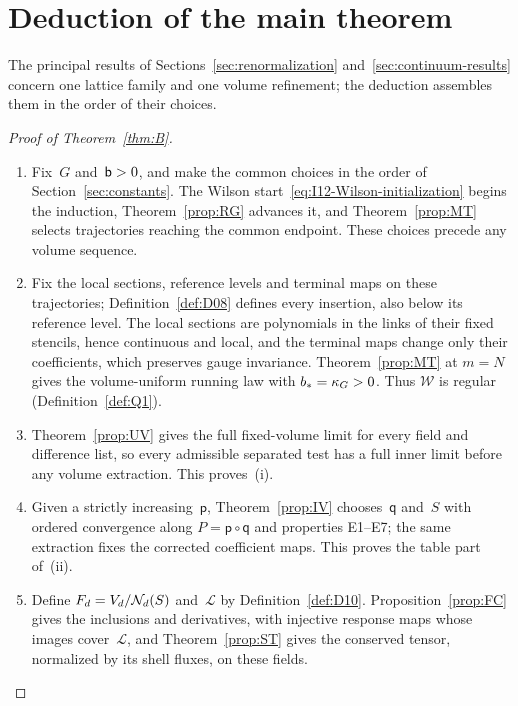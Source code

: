 \section{Deduction of the main theorem}\label{sec:deduction}

The principal results of Sections~\ref{sec:renormalization} and~\ref{sec:continuum-results} concern one lattice family and one volume refinement; the deduction assembles them in the order of their choices.

\begin{proof}[Proof of Theorem~\ref{thm:B}]
\begin{enumerate}[label=\textup{\arabic*.},ref=\arabic*,itemsep=0.25em]
\item\label{step:deduction-choice} Fix~$G$ and~$\mathsf{b}>0$, and make the common choices in the order of Section~\ref{sec:constants}. The Wilson start~\eqref{eq:I12-Wilson-initialization} begins the induction, Theorem~\ref{prop:RG} advances it, and Theorem~\ref{prop:MT} selects trajectories reaching the common endpoint. These choices precede any volume sequence.

\item\label{step:deduction-family} Fix the local sections, reference levels and terminal maps on these trajectories; Definition~\ref{def:D08} defines every insertion, also below its reference level. The local sections are polynomials in the links of their fixed stencils, hence continuous and local, and the terminal maps change only their coefficients, which preserves gauge invariance. Theorem~\ref{prop:MT} at $m=N$ gives the volume-uniform running law with $b_*=\kappa_G>0$. Thus $\mathcal W$ is regular (Definition~\ref{def:Q1}).

\item\label{step:deduction-uv} Theorem~\ref{prop:UV} gives the full fixed-volume limit for every field and difference list, so every admissible separated test has a full inner limit before any volume extraction. This proves~(i).

\item\label{step:deduction-volume} Given a strictly increasing~$\mathsf p$, Theorem~\ref{prop:IV} chooses~$\mathsf q$ and~$S$ with ordered convergence along $P=\mathsf p\circ\mathsf q$ and properties E1--E7; the same extraction fixes the corrected coefficient maps. This proves the table part of~(ii).

\item\label{step:deduction-stress} Define $F_d=V_d/\mathcal{N}_{d}(S)$ and~$\mathcal L$ by Definition~\ref{def:D10}. Proposition~\ref{prop:FC} gives the inclusions and derivatives, with injective response maps whose images cover~$\mathcal L$, and Theorem~\ref{prop:ST} gives the conserved tensor, normalized by its shell fluxes, on these fields.


\end{enumerate}
\end{proof}
